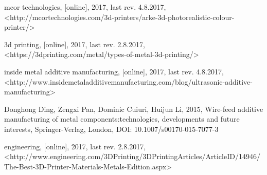 \documentclass[a4paper, twoside, 11pt]{report}
\begin{document}
\begin{thebibliography}{99}
	mcor technologies,
	[online],
	2017,
	last rev. 4.8.2017,
	<http://mcortechnologies.com/3d-printers/arke-3d-photorealistic-colour-printer/>

	3d printing,
	[online],
	2017,
	last rev. 2.8.2017,
	<https://3dprinting.com/metal/types-of-metal-3d-printing/>

	inside metal additive manufacturing,
	[online],
	2017,
	last rev. 4.8.2017,
	<http://www.insidemetaladditivemanufacturing.com/blog/ultrasonic-additive-manufacturing>

	Donghong Ding, Zengxi Pan, Dominic Cuiuri, Huijun Li,
	2015,
	Wire-feed additive manufacturing of metal components:technologies, developments and future interests,
	Springer-Verlag,
	London,
	DOI: 10.1007/s00170-015-7077-3
	
	engineering,
	[online],
	2017,
	last rev. 2.8.2017,
	<http://www.engineering.com/3DPrinting/3DPrintingArticles/ArticleID/14946/The-Best-3D-Printer-Materials-Metals-Edition.aspx>
	
\end{thebibliography}
\end{document}
